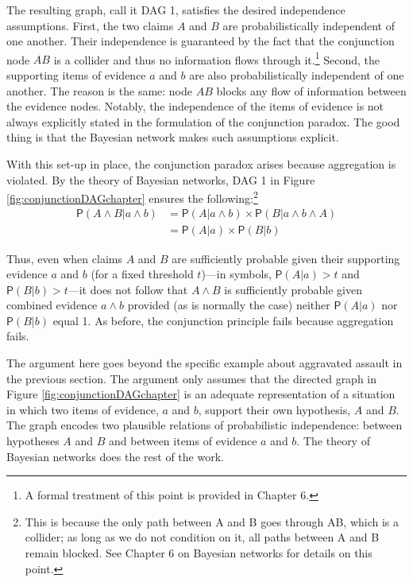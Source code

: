 \documentclass[
  10pt,
  dvipsnames,enabledeprecatedfontcommands]{scrartcl}
\newcommand{\et}{\wedge}
\newcommand{\pr}[1]{\ensuremath{\mathsf{P}(#1)}}
\begin{document}
The resulting graph, call it \textsf{DAG 1}, satisfies the desired
independence assumptions. First, the two claims \(A\) and \(B\) are
probabilistically independent of one another. Their independence is
guaranteed by the fact that the conjunction node \(AB\) is a collider
and thus no information flows through
it.\footnote{A formal treatment of this point is provided in Chapter 6.}
Second, the supporting items of evidence \(a\) and \(b\) are also
probabilistically independent of one another. The reason is the same:
node \(AB\) blocks any flow of information between the evidence nodes.
Notably, the independence of the items of evidence is not always
explicitly stated in the formulation of the conjunction paradox. The
good thing is that the Bayesian network makes such assumptions explicit.

With this set-up in place, the conjunction paradox arises because
aggregation is violated. By the theory of Bayesian networks,
\textsf{DAG 1} in Figure \ref{fig:conjunctionDAGchapter} ensures the
following:\footnote{This is because the only path between \textsf{A} and
  \textsf{B} goes through \textsf{AB}, which is a collider; as long as
  we do not condition on it, all paths between \textsf{A} and \textsf{B}
  remain blocked. See Chapter 6 on Bayesian networks for details on this
  point.}  \begin{align*}
\pr{A \wedge  B \vert a \wedge b}& =\pr{A \vert a \wedge b} \times \pr{B \vert  a \wedge b \wedge A}\\
 & = \pr{A \vert a} \times \pr{B \vert  b}
 \end{align*}

\noindent Thus, even when claims \(A\) and \(B\) are sufficiently
probable given their supporting evidence \(a\) and \(b\) (for a fixed
threshold \(t\))---in symbols, \(\pr{A \vert a}>t\) and
\(\pr{B \vert b}>t\)---it does not follow that \(A \et B\) is
sufficiently probable given combined evidence \(a\et b\) provided (as is
normally the case) neither \(\pr{A \vert a}\) nor \(\pr{B \vert b}\)
equal 1. As before, the conjunction principle fails because aggregation
fails.

The argument here goes beyond the specific example about aggravated
assault in the previous section. The argument only assumes that the
directed graph in Figure \ref{fig:conjunctionDAGchapter} is an adequate
representation of a situation in which two items of evidence, \(a\) and
\(b\), support their own hypothesis, \(A\) and \(B\). The graph encodes
two plausible relations of probabilistic independence: between
hypotheses \(A\) and \(B\) and between items of evidence \(a\) and
\(b\). The theory of Bayesian networks does the rest of the work.
\end{document}
